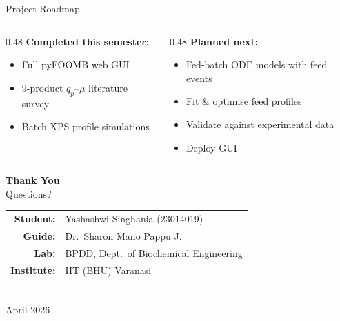 \documentclass[aspectratio=169, 11pt]{beamer}
\begin{document}
\begin{frame}{Project Roadmap}
  \vspace{0.2cm}
  \begin{columns}[T]
    \begin{column}{0.48\textwidth}
      \textbf{Completed this semester:}
      {\small
      \begin{itemize}
        \item[\textcolor{donegreen}{\checkmark}] Full pyFOOMB web GUI
        \item[\textcolor{donegreen}{\checkmark}] 9-product $q_p$--$\mu$ literature survey
        \item[\textcolor{donegreen}{\checkmark}] Batch XPS profile simulations
      \end{itemize}
      }
    \end{column}
    \begin{column}{0.48\textwidth}
      \textbf{Planned next:}
      {\small
      \begin{itemize}
        \item[\textcolor{accentblue}{$\circ$}] Fed-batch ODE models with feed events
        \item[\textcolor{accentblue}{$\circ$}] Fit \& optimise feed profiles
        \item[\textcolor{accentblue}{$\circ$}] Validate against experimental data
        \item[\textcolor{accentblue}{$\circ$}] Deploy GUI
      \end{itemize}
      }
    \end{column}
  \end{columns}
\end{frame}

\begin{frame}[plain]
  \vfill
  \begin{center}
    {\LARGE\bfseries\color{darkcharcoal} Thank You}\\[0.6cm]
    {\large\color{accentblue} Questions?}\\[1cm]
    \begin{tabular}{rl}
      \textbf{Student:} & Yashashwi Singhania (23014019) \\
      \textbf{Guide:} & Dr.\ Sharon Mano Pappu J. \\
      \textbf{Lab:} & BPDD, Dept.\ of Biochemical Engineering \\
      \textbf{Institute:} & IIT (BHU) Varanasi \\
    \end{tabular}\\[0.8cm]
    {\small\color{darkcharcoal!60} April 2026}
  \end{center}
  \vfill
\end{frame}
\end{document}
